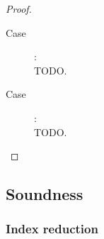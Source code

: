 \documentclass{article}
\newcommand{\sem}[1]{\llbracket #1 \rrbracket}
\begin{document}
\begin{proof}
\begin{description}





\item[Case ]:~\\

TODO.

\item[Case ]:~\\

TODO.

\end{description}

\end{proof}

\subsection*{Soundness}

\subsubsection*{Index reduction}
\end{document}

